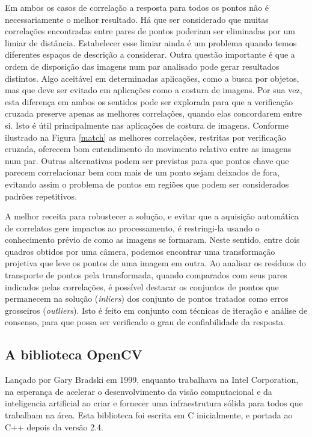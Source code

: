 Em ambos os casos de correlação a resposta para todos os pontos não é necessariamente o melhor resultado. Há que ser considerado que muitas correlações encontradas entre pares de pontos poderiam ser eliminadas por um limiar de distância. Estabelecer esse limiar ainda é um problema quando temos diferentes espaços de descrição a considerar. Outra questão importante é que a ordem de disposição das imagens num par analisado pode gerar resultados distintos.
Algo aceitável em determinadas aplicações, como a busca por objetos, mas que deve ser evitado em aplicações como a costura de imagens. Por sua vez, esta diferença em ambos os sentidos pode ser explorada para que a verificação cruzada preserve apenas as melhores correlações, quando elas concordarem entre si. Isto é útil principalmente nas aplicações de costura de imagens. Conforme ilustrado na Figura \ref{match} as melhores correlações, restritas por verificação cruzada, oferecem bom entendimento do movimento relativo entre as imagens num par. Outras alternativas podem ser previstas para que pontos chave que parecem correlacionar bem com mais de um ponto sejam deixados de fora, evitando assim o problema de pontos em regiões que podem ser considerados padrões repetitivos.

A melhor receita para robustecer a solução, e evitar que a aquisição automática de correlatos gere impactos ao processamento, é restringi-la usando o conhecimento prévio de como as imagens se formaram. Neste sentido, entre dois quadros obtidos por uma câmera, podemos encontrar uma transformação projetiva que leve os pontos de uma imagem em outra. Ao analisar os resíduos do transporte de pontos pela transformada, quando comparados com seus pares indicados pelas correlações, é possível destacar os conjuntos de pontos que permanecem na solução (\textit{inliers}) dos conjunto de pontos tratados como erros grosseiros (\textit{outliers}). Isto é feito em conjunto com técnicas de iteração e análise de consenso, para que possa ser verificado o grau de confiabilidade da resposta.



\subsection{A biblioteca OpenCV}

Lançado por Gary Bradski em 1999, enquanto trabalhava na Intel Corporation, na esperança de acelerar o desenvolvimento da visão computacional e da inteligencia artificial ao criar e fornecer uma infraestrutura sólida para todos que trabalham na área. Esta biblioteca foi escrita em C inicialmente, e portada ao C++ depois da versão 2.4.

